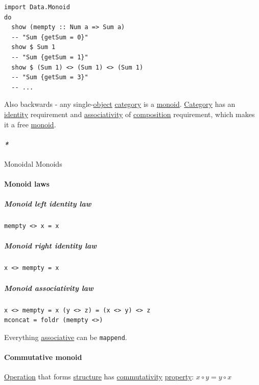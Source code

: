 \documentclass[a4paper,14pt,oneside]{book}
\begin{document}
\begin{verbatim}
import Data.Monoid
do
  show (mempty :: Num a => Sum a)
  -- "Sum {getSum = 0}"
  show $ Sum 1
  -- "Sum {getSum = 1}"
  show $ (Sum 1) <> (Sum 1) <> (Sum 1)
  -- "Sum {getSum = 3}"
  -- ...
\end{verbatim}

Also backwards - any single-\hyperref[org8d6cd26]{object} \hyperref[org82baa03]{category} is a \hyperref[org9e1ff1f]{monoid}. \hyperref[org82baa03]{Category} has an \hyperref[org5f89edb]{identity} requirement and \hyperref[org9dd9a70]{associativity} of \hyperref[orgc4a089b]{composition} requirement, which makes it a free \hyperref[org9e1ff1f]{monoid}. 

\paragraph{\emph{*}}
\label{sec:orgc18f8d0}

\label{org914b93b}Monoidal
\label{org4c498eb}Monoids

\paragraph{\label{org6c8180e}Monoid laws}
\label{sec:orgbe3fb94}
\subparagraph{\label{org86e5aee}Monoid left identity law}
\label{sec:org121e017}
\begin{verbatim}
mempty <> x = x
\end{verbatim}

\subparagraph{\label{orgf6ec208}Monoid right identity law}
\label{sec:org179f27d}
\begin{verbatim}
x <> mempty = x
\end{verbatim}

\subparagraph{\label{org60687fc}Monoid associativity law}
\label{sec:org093b180}
\begin{verbatim}
x <> mempty = x (y <> z) = (x <> y) <> z
mconcat = foldr (mempty <>)
\end{verbatim}

Everything \hyperref[org9127e11]{associative} can be \texttt{mappend}.

\paragraph{\label{orgb8fde83}Commutative monoid}
\label{sec:orgbd9dd97}
\hyperref[orgf96349c]{Operation} that forms \hyperref[org105c77d]{structure} has \hyperref[org4500176]{commutativity} \hyperref[org81d0df4]{property}:
\(x \circ y = y \circ x\)
\end{document}
